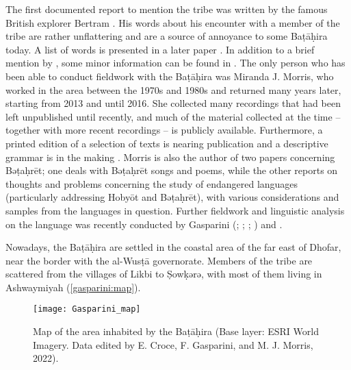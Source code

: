 \documentclass[output=paper]{langscibook}
\begin{document}
The first documented report to mention the tribe was written by the famous British explorer Bertram \citet[100]{thomas_among_1929}. His words about his encounter with a member of the tribe are rather unflattering and are a source of annoyance to some Baṭāḥira today. A list of words is presented in a later paper \citep{thomas_four_1937}. In addition to a brief mention by \citet{dostal_remarks_1960}, some minor information can be found in \citet{janzen_nomaden_1967}. The only person who has been able to conduct fieldwork with the Baṭāḥira was Miranda J. Morris, who worked in the area between the 1970s and 1980s and returned many years later, starting from 2013 and until 2016. She collected many recordings that had been left unpublished until recently, and much of the material collected at the time – together with more recent recordings \citep{morris_documentation_2016} – is publicly available. Furthermore, a printed edition of a selection of texts is nearing publication \citep{morris_collection_nodate} and a descriptive grammar is in the making \citep{morris_descriptive_nodate}. Morris is also the author of two papers concerning Bəṭaḥrēt; one \citep{morris_preliminary_1983} deals with Bəṭaḥrēt songs and poems, while the other \citep{morris_thoughts_2017} reports on thoughts and problems concerning the study of endangered languages (particularly addressing Hobyōt and Bəṭaḥrēt), with various considerations and samples from the languages in question. Further fieldwork and linguistic analysis on the language was recently conducted by Gasparini 
(\citeyear{gasparini_phonetics_2017}; \citeyear{gasparini_bathari_2018};  \citeyear{gasparini_emphasis_2021}; \citeyear{gasparini_nominalizzazione_2021})
and \citet{lucas_modern_2020}.


Nowadays, the Baṭāḥira are settled in the coastal area of the far east of Dhofar, near the border with the al-Wusṭā governorate. Members of the tribe are scattered from the villages of Likbi to Ṣowḳǝrǝ, with most of them living in Ashwaymiyah (\autoref{gasparini:map}). 


\begin{figure}
    \texttt{[image: Gasparini\_map]}
    \caption{Map of the area inhabited by the Baṭāḥira (Base layer: ESRI World Imagery. Data edited by E. Croce, F. Gasparini, and M. J. Morris, 2022).}
    \label{gasparini:map}
\end{figure}
\end{document}
